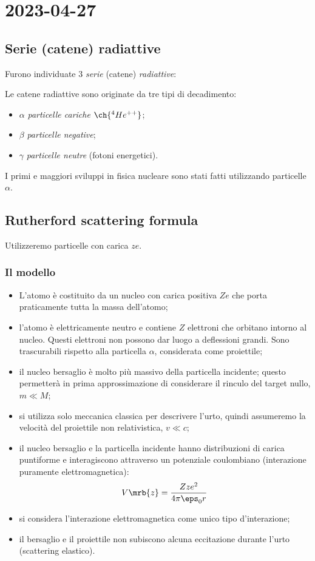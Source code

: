 \chapter{2023-04-27}
\section{Serie (catene) radiattive}
Furono individuate $3$ \textit{serie} (catene) \textit{radiattive}:

Le catene radiattive sono originate da tre tipi di decadimento:
\begin{itemize}
	\item $\alpha$ \rightarrow \textit{particelle cariche} $\ch{^{4}He^{++}}$;
	\item $\beta$ \rightarrow \textit{particelle negative};
	\item $\gamma$ \rightarrow \textit{particelle neutre} (fotoni energetici).
\end{itemize}
I primi e maggiori sviluppi in fisica nucleare sono stati fatti utilizzando
particelle $\alpha$.

\section{Rutherford scattering formula}
Utilizzeremo particelle con carica $ze$.

\subsection{Il modello}
\begin{itemize}
	\item L'atomo è costituito da un nucleo con carica positiva $Ze$ che porta
	      praticamente tutta la massa dell'atomo;
	\item l'atomo è elettricamente neutro e contiene $Z$ elettroni che orbitano
	      intorno al nucleo. Questi elettroni non possono dar luogo a deflessioni
	      grandi. Sono trascurabili rispetto alla particella $\alpha$, considerata
	      come proiettile;
	\item il nucleo bersaglio è molto più massivo della particella incidente;
	      questo permetterà in prima approssimazione di considerare il rinculo del
	      target nullo, $m \ll M$;
	\item si utilizza solo meccanica classica per descrivere l'urto, quindi
	      assumeremo la velocità del proiettile non relativistica, $v \ll c$;
	\item il nucleo bersaglio e la particella incidente hanno distribuzioni di
	      carica puntiforme e interagiscono attraverso un potenziale coulombiano
	      (interazione puramente elettromagnetica):
	      \begin{equation}
		      V \mrb{z} = \frac{Z z e^2}{4 \pi \eps_0 r}
	      \end{equation}
	\item si considera l'interazione elettromagnetica come unico tipo
	      d'interazione;
	\item il bersaglio e il proiettile non subiscono alcuna eccitazione durante
	      l'urto (scattering elastico).
\end{itemize}


